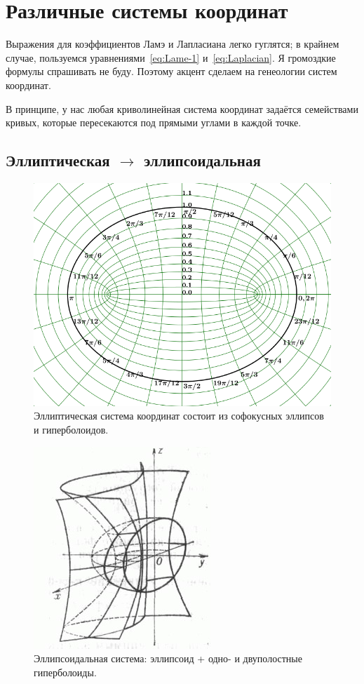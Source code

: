 \documentclass[12pt]{report}
\begin{document}
 \section{Различные системы координат}
 Выражения для коэффициентов Ламэ и Лапласиана легко гуглятся; в крайнем случае, пользуемся уравнениями~\eqref{eq:Lame-1} и~\eqref{eq:Laplacian}. Я громоздкие формулы спрашивать не буду. 
 Поэтому акцент сделаем на генеологии систем координат.
 
 В принципе, у нас любая криволинейная система координат задаётся семействами кривых, которые пересекаются под прямыми углами в каждой точке. 
 \subsection{Эллиптическая $\to$ эллипсоидальная}
\begin{figure}[h]\centering
 	\includegraphics[width=.8\linewidth]{elliptical_coordinates}
 	\caption{Эллиптическая система координат состоит из софокусных эллипсов и гиперболоидов.}
\end{figure}
\begin{figure}[h]\centering
 	\includegraphics[height=.35\paperheight]{ellipsoidal_cs}
 	\caption{Эллипсоидальная система: эллипсоид + одно- и двуполостные гиперболоиды.}
\end{figure}
\end{document}
